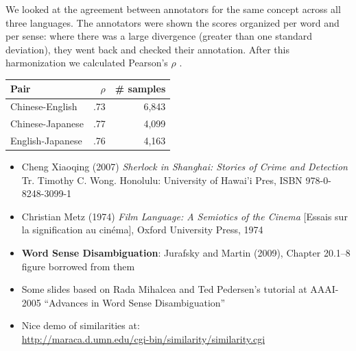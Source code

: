 \documentclass[a4paper,landscape,headrule,footrule,xetex]{foils}
\begin{document}

  We looked at the agreement between annotators for the same concept
  across all three languages. The annotators were shown the scores
  organized per word and per sense: where there was a large divergence
  (greater than one standard deviation), they went back and checked
  their annotation.  After this harmonization we calculated Pearson's
  $\rho$ \citep{Pearson:1895}.

 \begin{center}
  \begin{tabular}{lrr}
    \textbf{Pair} & $\rho$ & \textbf{\# samples} \\
    \hline
    Chinese-English  & .73   &  6,843   \\     
    Chinese-Japanese & .77   &  4,099     \\     
    English-Japanese & .76   &  4,163      
  \end{tabular}
\end{center}






  \begin{itemize}
  \item Cheng Xiaoqing (2007) \textit{Sherlock in Shanghai: Stories of
      Crime and Detection} Tr. Timothy C. Wong. Honolulu: University
    of Hawai’i Pres,  ISBN 978-0-8248-3099-1 
  \item  Christian Metz (1974) \textit{Film Language: A Semiotics of
      the Cinema} [Essais sur la signification au cinéma], Oxford
    University Press, 1974
\item \textbf{Word Sense Disambiguation}:  Jurafsky and Martin (2009),
  Chapter 20.1--8
  \\ figure borrowed from them
\item Some slides based on Rada Mihalcea and Ted Pedersen's tutorial at
  AAAI-2005 ``Advances in Word Sense Disambiguation''
\item Nice demo of similarities at:
\\ \url{http://maraca.d.umn.edu/cgi-bin/similarity/similarity.cgi}

\end{itemize}


\small


\end{document}

